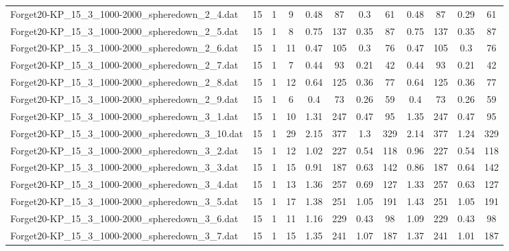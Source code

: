 \begin{sidewaystable}[!ht]
{\begin{tabular}{lccccccccccc}
Forget20-KP\_15\_3\_1000-2000\_spheredown\_2\_4.dat & 15 & 1 & 9 & 0.48 & 87 & 0.3 & 61 & 0.48 & 87 &  \textcolor{blue2}{0.29} & 61 \\
Forget20-KP\_15\_3\_1000-2000\_spheredown\_2\_5.dat & 15 & 1 & 8 & 0.75 & 137 &  \textcolor{blue2}{0.35} & 87 & 0.75 & 137 &  \textcolor{blue2}{0.35} & 87 \\
Forget20-KP\_15\_3\_1000-2000\_spheredown\_2\_6.dat & 15 & 1 & 11 & 0.47 & 105 &  \textcolor{blue2}{0.3} & 76 & 0.47 & 105 &  \textcolor{blue2}{0.3} & 76 \\
Forget20-KP\_15\_3\_1000-2000\_spheredown\_2\_7.dat & 15 & 1 & 7 & 0.44 & 93 &  \textcolor{blue2}{0.21} & 42 & 0.44 & 93 &  \textcolor{blue2}{0.21} & 42 \\
Forget20-KP\_15\_3\_1000-2000\_spheredown\_2\_8.dat & 15 & 1 & 12 & 0.64 & 125 &  \textcolor{blue2}{0.36} & 77 & 0.64 & 125 &  \textcolor{blue2}{0.36} & 77 \\
Forget20-KP\_15\_3\_1000-2000\_spheredown\_2\_9.dat & 15 & 1 & 6 & 0.4 & 73 &  \textcolor{blue2}{0.26} & 59 & 0.4 & 73 &  \textcolor{blue2}{0.26} & 59 \\
Forget20-KP\_15\_3\_1000-2000\_spheredown\_3\_1.dat & 15 & 1 & 10 & 1.31 & 247 &  \textcolor{blue2}{0.47} & 95 & 1.35 & 247 &  \textcolor{blue2}{0.47} & 95 \\
Forget20-KP\_15\_3\_1000-2000\_spheredown\_3\_10.dat & 15 & 1 & 29 & 2.15 & 377 & 1.3 & 329 & 2.14 & 377 &  \textcolor{blue2}{1.24} & 329 \\
Forget20-KP\_15\_3\_1000-2000\_spheredown\_3\_2.dat & 15 & 1 & 12 & 1.02 & 227 &  \textcolor{blue2}{0.54} & 118 & 0.96 & 227 &  \textcolor{blue2}{0.54} & 118 \\
Forget20-KP\_15\_3\_1000-2000\_spheredown\_3\_3.dat & 15 & 1 & 15 & 0.91 & 187 &  \textcolor{blue2}{0.63} & 142 & 0.86 & 187 & 0.64 & 142 \\
Forget20-KP\_15\_3\_1000-2000\_spheredown\_3\_4.dat & 15 & 1 & 13 & 1.36 & 257 & 0.69 & 127 & 1.33 & 257 &  \textcolor{blue2}{0.63} & 127 \\
Forget20-KP\_15\_3\_1000-2000\_spheredown\_3\_5.dat & 15 & 1 & 17 & 1.38 & 251 &  \textcolor{blue2}{1.05} & 191 & 1.43 & 251 &  \textcolor{blue2}{1.05} & 191 \\
Forget20-KP\_15\_3\_1000-2000\_spheredown\_3\_6.dat & 15 & 1 & 11 & 1.16 & 229 &  \textcolor{blue2}{0.43} & 98 & 1.09 & 229 &  \textcolor{blue2}{0.43} & 98 \\
Forget20-KP\_15\_3\_1000-2000\_spheredown\_3\_7.dat & 15 & 1 & 15 & 1.35 & 241 & 1.07 & 187 & 1.37 & 241 &  \textcolor{blue2}{1.01} & 187 \\

\end{tabular}}
\end{sidewaystable}
